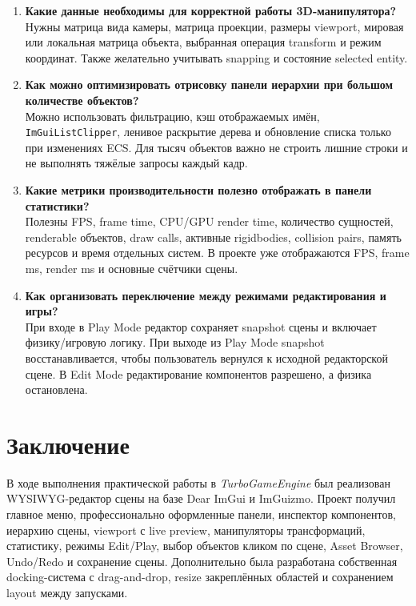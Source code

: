 \documentclass[a4paper,14pt]{extarticle}
\begin{document}
\begin{enumerate}
  \item \textbf{Какие данные необходимы для корректной работы 3D-манипулятора?}\\
  Нужны матрица вида камеры, матрица проекции, размеры viewport, мировая или локальная матрица объекта, выбранная операция transform и режим координат. Также желательно учитывать snapping и состояние selected entity.

  \item \textbf{Как можно оптимизировать отрисовку панели иерархии при большом количестве объектов?}\\
  Можно использовать фильтрацию, кэш отображаемых имён, \texttt{ImGuiListClipper}, ленивое раскрытие дерева и обновление списка только при изменениях ECS. Для тысяч объектов важно не строить лишние строки и не выполнять тяжёлые запросы каждый кадр.

  \item \textbf{Какие метрики производительности полезно отображать в панели статистики?}\\
  Полезны FPS, frame time, CPU/GPU render time, количество сущностей, renderable объектов, draw calls, активные rigidbodies, collision pairs, память ресурсов и время отдельных систем. В проекте уже отображаются FPS, frame ms, render ms и основные счётчики сцены.

  \item \textbf{Как организовать переключение между режимами редактирования и игры?}\\
  При входе в Play Mode редактор сохраняет snapshot сцены и включает физику/игровую логику. При выходе из Play Mode snapshot восстанавливается, чтобы пользователь вернулся к исходной редакторской сцене. В Edit Mode редактирование компонентов разрешено, а физика остановлена.
\end{enumerate}

\section{Заключение}
В ходе выполнения практической работы в \textit{TurboGameEngine} был реализован WYSIWYG-редактор сцены на базе Dear ImGui и ImGuizmo. Проект получил главное меню, профессионально оформленные панели, инспектор компонентов, иерархию сцены, viewport с live preview, манипуляторы трансформаций, статистику, режимы Edit/Play, выбор объектов кликом по сцене, Asset Browser, Undo/Redo и сохранение сцены. Дополнительно была разработана собственная docking-система с drag-and-drop, resize закреплённых областей и сохранением layout между запусками.
\end{document}
